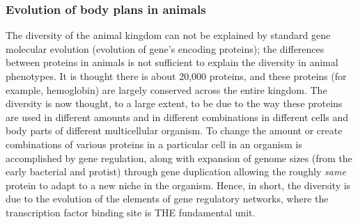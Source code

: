 \subsubsection{Evolution of body plans in animals}

The diversity of the animal kingdom can not be explained by standard gene molecular evolution (evolution of gene's encoding proteins); the differences between proteins in animals is not sufficient to explain the diversity in animal phenotypes\cite{pmid1090005}.  It is thought there is about 20,000 proteins, and these proteins (for example, hemoglobin) are largely conserved across the entire kingdom.  The diversity is now thought, to a large extent, to be due to the way these proteins are used in different amounts and in different combinations in different cells and body parts of different multicellular organism\cite{King}.  To change the amount or create combinations of various proteins in a particular cell in an organism is accomplished by gene regulation, along with expansion of genome sizes (from the early bacterial and protist) through gene duplication allowing the roughly \textit{same} protein to adapt to a new niche in the organism.  Hence, in short, the diversity is due to the evolution of the elements of gene regulatory networks, where the transcription factor binding site is THE fundamental unit.
